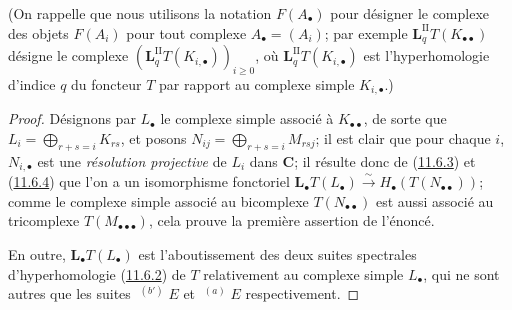 (On rappelle que nous utilisons la notation $F(A_\bullet)$ pour désigner le
complexe des objets $F(A_i)$ pour tout complexe $A_\bullet=(A_i)$; par
exemple $\mathbf{L}_q^{\mathrm{II}}T(K_{\bullet\bullet})$ désigne le complexe
$(\mathbf{L}_q^{\mathrm{II}}T(K_{i,\bullet}))_{i\geq0}$, où
$\mathbf{L}_q^{\mathrm{II}}T(K_{i,\bullet})$ est l'hyperhomologie d'indice $q$ du
foncteur $T$ par rapport au complexe simple $K_{i,\bullet}$.)

\begin{proof}
Désignons par $L_\bullet$ le complexe simple associé à
$K_{\bullet\bullet}$, de sorte que $L_i=\bigoplus_{r+s=i}K_{rs}$, et
posons
$N_{ij}=\bigoplus_{r+s=i}M_{rsj}$;
il est clair que pour chaque $i$, $N_{i,\bullet}$ est une \emph{résolution
projective} de $L_i$ dans $\boldsymbol{C}$; il résulte donc de
(\hyperref[0.11.6.3-fr]{11.6.3}) et
(\hyperref[0.11.6.4-fr]{11.6.4}) que l'on a un isomorphisme fonctoriel
$
\mathbf{L}_\bullet T(L_\bullet)\xrightarrow{\sim} H_\bullet(T(N_{\bullet\bullet}))$;
comme le complexe simple associé au bicomplexe $T(N_{\bullet\bullet})$ est
aussi associé au tricomplexe $T(M_{\bullet\bullet\bullet})$, cela prouve la
première assertion de l'énoncé.

En outre, $\mathbf{L}_\bullet T(L_\bullet)$ est l'aboutissement des deux suites
spectrales d'hyperhomologie (\hyperref[0.11.6.2-fr]{11.6.2}) de $T$
relativement au complexe simple $L_\bullet$, qui ne sont autres que les suites
$\mathop{}^{(b')}E$ et $\mathop{}^{(a)}E$ respectivement.


\end{proof}
